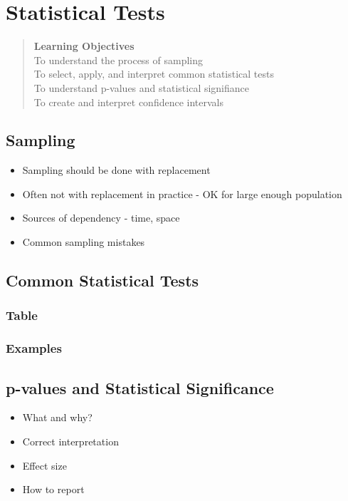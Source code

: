 \documentclass[
]{book}
\providecommand{\tightlist}{%
  \setlength{\itemsep}{0pt}\setlength{\parskip}{0pt}}
\begin{document}
\chapter{Statistical Tests}\label{stat_tests}

\begin{quote}
\textbf{Learning Objectives}\\
To understand the process of sampling\\
To select, apply, and interpret common statistical tests\\
To understand p-values and statistical signifiance\\
To create and interpret confidence intervals
\end{quote}

\section{Sampling}\label{sampling}

\begin{itemize}
\tightlist
\item
  Sampling should be done with replacement
\item
  Often not with replacement in practice - OK for large enough population
\item
  Sources of dependency - time, space
\item
  Common sampling mistakes
\end{itemize}

\section{Common Statistical Tests}\label{common-statistical-tests}

\subsection{Table}\label{table}

\subsection{Examples}\label{examples}

\section{p-values and Statistical Significance}\label{p-values-and-statistical-significance}

\begin{itemize}
\tightlist
\item
  What and why?
\item
  Correct interpretation
\item
  Effect size
\item
  How to report
\end{itemize}
\end{document}
